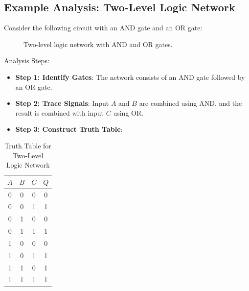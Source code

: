 \documentclass{article}
\begin{document}
\subsection{Example Analysis: Two-Level Logic Network}
Consider the following circuit with an AND gate and an OR gate:
\begin{figure}[h]
    \centering
    \caption{Two-level logic network with AND and OR gates.}
\end{figure}

\noindent Analysis Steps:
\begin{itemize}
    \item \textbf{Step 1: Identify Gates}: The network consists of an AND gate followed by an OR gate.
    \item \textbf{Step 2: Trace Signals}: Input $A$ and $B$ are combined using AND, and the result is combined with input $C$ using OR.
    \item \textbf{Step 3: Construct Truth Table}:
\end{itemize}
\begin{table}[h]
    \centering
    \begin{tabular}{|c|c|c|c|}
        \hline
        $A$ & $B$ & $C$ & $Q$ \\
        \hline
        0 & 0 & 0 & 0 \\
        0 & 0 & 1 & 1 \\
        0 & 1 & 0 & 0 \\
        0 & 1 & 1 & 1 \\
        1 & 0 & 0 & 0 \\
        1 & 0 & 1 & 1 \\
        1 & 1 & 0 & 1 \\
        1 & 1 & 1 & 1 \\
        \hline
    \end{tabular}
    \caption{Truth Table for Two-Level Logic Network}
\end{table}
\pagebreak
\end{document}
